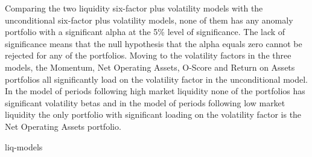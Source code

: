 \documentclass[a4paper,12pt]{article}                 %
\begin{document}
Comparing the two liquidity six-factor plus volatility models with the unconditional six-factor plus volatility models, none of them has any anomaly portfolio with a significant alpha at the 5\% level of significance. The lack of significance means that the null hypothesis that the alpha equals zero cannot be rejected for any of the portfolios. Moving to the volatility factors in the three models, the Momentum, Net Operating Assets, O-Score and Return on Assets portfolios all significantly load on the volatility factor in the unconditional model. In the model of periods following high market liquidity none of the portfolios has significant volatility betas and in the model of periods following low market liquidity the only portfolio with significant loading on the volatility factor is the Net Operating Assets portfolio. 

{liq-models}
\FloatBarrier




\end{document}
